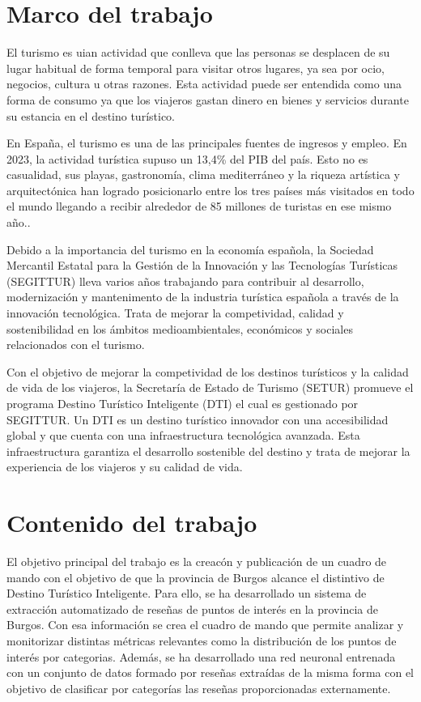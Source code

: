 
\section{Marco del trabajo}

El turismo es uian actividad que conlleva que las personas se desplacen
de su lugar habitual de forma temporal para visitar otros lugares, ya sea por
ocio, negocios, cultura u otras razones. Esta actividad puede ser entendida
como una forma de consumo ya que los viajeros gastan dinero en bienes y
servicios durante su estancia en el destino turístico.\cite{turismo}

En España, el turismo es una de las principales fuentes de ingresos y
empleo. En 2023, la actividad turística supuso un 13,4\% del PIB del país.
Esto no es casualidad, sus playas, gastronomía, clima mediterráneo y la
riqueza artística y arquitectónica han logrado posicionarlo entre los tres
países más visitados en todo el mundo llegando a recibir alrededor de 85
millones de turistas en ese mismo año.\cite{turismoEspana2025}.

Debido a la importancia del turismo en la economía española, la Sociedad
Mercantil Estatal para la Gestión de la Innovación y las Tecnologías Turísticas (SEGITTUR) lleva varios años trabajando para contribuir al desarrollo,
modernización y mantenimento de la industria turística española a través
de la innovación tecnológica. Trata de mejorar la competividad, calidad
y sostenibilidad en los ámbitos medioambientales, económicos y sociales
relacionados con el turismo.\cite{segitturEjes}

Con el objetivo de mejorar la competividad de los destinos turísticos
y la calidad de vida de los viajeros, la Secretaría de Estado de Turismo
(SETUR) promueve el programa Destino Turístico Inteligente (DTI) el cual
es gestionado por SEGITTUR. Un DTI es un destino turístico innovador con
una accesibilidad global y que cuenta con una infraestructura tecnológica avanzada. Esta infraestructura garantiza el desarrollo sostenible del destino
y trata de mejorar la experiencia de los viajeros y su calidad de vida.\cite{segittur:dti}

\section{Contenido del trabajo}

El objetivo principal del trabajo es la creacón y publicación de un cuadro
de mando con el objetivo de que la provincia de Burgos alcance el distintivo
de Destino Turístico Inteligente. Para ello, se ha desarrollado un sistema
de extracción automatizado de reseñas de puntos de interés en la provincia
de Burgos. Con esa información se crea el cuadro de mando que permite
analizar y monitorizar distintas métricas relevantes como la distribución de
los puntos de interés por categorias. Además, se ha desarrollado una red
neuronal entrenada con un conjunto de datos formado por reseñas extraídas
de la misma forma con el objetivo de clasificar por categorías las reseñas
proporcionadas externamente.

